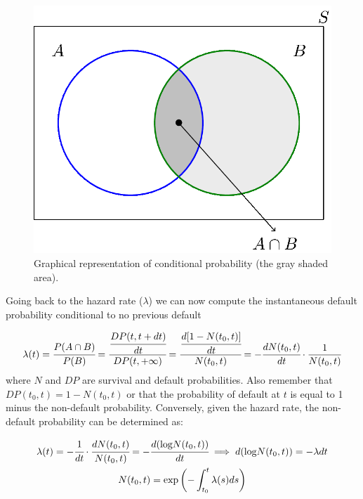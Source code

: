 \begin{figure}[tb]
\centering
\includegraphics[width=0.7\linewidth]{figures/conditional_b.png}
\caption{Graphical representation of conditional probability (the gray shaded area).}
\end{figure}

Going back to the hazard rate ($\lambda$) we can now compute the instantaneous default probability conditional to no previous default 

\begin{equation}\lambda(t) = \cfrac{P(A\cap B)}{P(B)} = \cfrac{\cfrac{DP(t, t+dt)}{dt}}{DP(t, +\infty)} = \cfrac{\cfrac{d[1-N(t_0, t)]}{dt}}{N(t_0, t)} = -\cfrac{dN(t_0, t)}{dt}\cdot\frac{1}{N(t_0, t)}\end{equation}
where $N$ and $DP$ are survival and default probabilities.%
Also remember that $DP(t_0, t) = 1 - N(t_0, t)$ or that the probability of default at $t$ is equal to 1 minus the non-default probability.
Conversely, given the hazard rate, the non-default probability can be
determined as:

\begin{equation}
\begin{gathered}
\lambda(t) = -\cfrac{1}{dt}\cdot\cfrac{dN(t_0, t)}{N(t_0, t)} = -\cfrac{d(\textrm{log}N(t_0, t))}{dt} \implies d(\textrm{log}N(t_0, t)) = -\lambda dt\\
N(t_0, t) = \mathrm{exp}\left(-\int_{t_0}^{t}\lambda(s) ds\right)
\end{gathered}
\end{equation}

